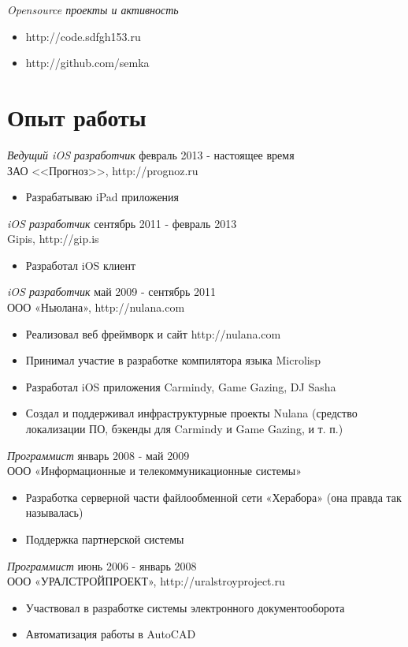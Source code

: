 \documentclass[12pt]{res} %
\begin{document}
\begin{resume}
{\sl Opensource проекты и активность}
\begin{itemize}
\item http://code.sdfgh153.ru
\item http://github.com/semka
\end{itemize}

\section{Опыт работы}

{\sl Ведущий iOS разработчик} \hfill февраль 2013 - настоящее время \\
ЗАО <<Прогноз>>, http://prognoz.ru 
\begin{itemize} \itemsep -2pt
\item Разрабатываю iPad приложения
\end{itemize}

{\sl iOS разработчик} \hfill сентябрь 2011 - февраль 2013 \\
Gipis, http://gip.is 
\begin{itemize} \itemsep -2pt
\item Разработал iOS клиент
\end{itemize}

{\sl iOS разработчик} \hfill май 2009 - сентябрь 2011 \\
ООО «Ньюлана», http://nulana.com
\begin{itemize} 
\item Реализовал веб фреймворк и сайт http://nulana.com
\item Принимал участие в разработке компилятора языка Microlisp 
\item Разработал iOS приложения Carmindy, Game Gazing, DJ Sasha
\item Создал и поддерживал инфраструктурные проекты Nulana (средство локализации ПО, бэкенды для Carmindy и Game Gazing, и т. п.)
\end{itemize} 

{\sl Программист} \hfill январь 2008 - май 2009 \\
ООО «Информационные и телекоммуникационные системы»
\begin{itemize}
\item Разработка серверной части файлообменной сети «Херабора» (она правда так называлась)
\item Поддержка партнерской системы
\end{itemize} 

{\sl Программист} \hfill июнь 2006 - январь 2008 \\
ООО «УРАЛСТРОЙПРОЕКТ», http://uralstroyproject.ru
\begin{itemize}
\item Участвовал в разработке системы электронного документооборота
\item Автоматизация работы в AutoCAD
\end{itemize} 


\end{resume}
\end{document}
